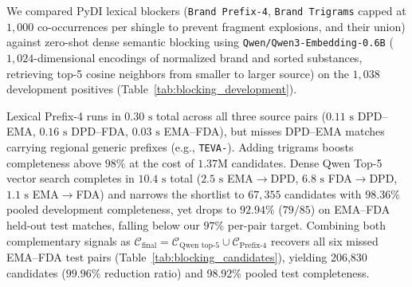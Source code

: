 \documentclass{llncs}
\begin{document}
We compared PyDI lexical blockers (\texttt{Brand Prefix-4}, \texttt{Brand Trigrams} capped at $1{,}000$ co-occurrences per shingle to prevent fragment explosions, and their union) against zero-shot dense semantic blocking using \texttt{Qwen/Qwen3-Embedding-0.6B} ($1{,}024$-dimensional encodings of normalized brand and sorted substances, retrieving top-5 cosine neighbors from smaller to larger source) on the $1{,}038$ development positives (Table~\ref{tab:blocking_development}).

Lexical Prefix-4 runs in $0.30\text{ s}$ total across all three source pairs ($0.11\text{ s}$ DPD--EMA, $0.16\text{ s}$ DPD--FDA, $0.03\text{ s}$ EMA--FDA), but misses DPD--EMA matches carrying regional generic prefixes (e.g., \texttt{TEVA-}). Adding trigrams boosts completeness above $98\%$ at the cost of $1.37\text{M}$ candidates. Dense Qwen Top-5 vector search completes in $10.4\text{ s}$ total ($2.5\text{ s}$ EMA$\rightarrow$DPD, $6.8\text{ s}$ FDA$\rightarrow$DPD, $1.1\text{ s}$ EMA$\rightarrow$FDA) and narrows the shortlist to $67{,}355$ candidates with $98.36\%$ pooled development completeness, yet drops to $92.94\%$ ($79/85$) on EMA--FDA held-out test matches, falling below our $97\%$ per-pair target. Combining both complementary signals as $\mathcal{C}_{\text{final}} = \mathcal{C}_{\text{Qwen top-5}} \cup \mathcal{C}_{\text{Prefix-4}}$ recovers all six missed EMA--FDA test pairs (Table~\ref{tab:blocking_candidates}), yielding 206,830 candidates ($99.96\%$ reduction ratio) and 98.92\% pooled test completeness.
\end{document}
